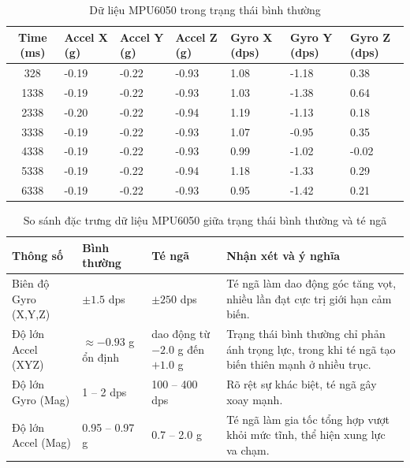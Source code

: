 \begin{table}[H]
\centering
\caption{Dữ liệu MPU6050 trong trạng thái bình thường}
\label{tab:normal_log_data}
\begin{tabularx}{\textwidth}{|c|X|X|X|X|X|X|}
\hline
\textbf{Time (ms)} & \textbf{Accel X (g)} & \textbf{Accel Y (g)} & \textbf{Accel Z (g)} & \textbf{Gyro X (dps)} & \textbf{Gyro Y (dps)} & \textbf{Gyro Z (dps)} \\
\hline
328  & -0.19 & -0.22 & -0.93 & 1.08 & -1.18 & 0.38 \\
1338 & -0.19 & -0.22 & -0.93 & 1.03 & -1.38 & 0.64 \\
2338 & -0.20 & -0.22 & -0.94 & 1.19 & -1.13 & 0.18 \\
3338 & -0.19 & -0.22 & -0.93 & 1.07 & -0.95 & 0.35 \\
4338 & -0.19 & -0.22 & -0.93 & 0.99 & -1.02 & -0.02 \\
5338 & -0.19 & -0.22 & -0.94 & 1.18 & -1.33 & 0.29 \\
6338 & -0.19 & -0.22 & -0.93 & 0.95 & -1.42 & 0.21 \\
\hline
\end{tabularx}
\end{table}

\begin{table}[H]
\centering
\caption{So sánh đặc trưng dữ liệu MPU6050 giữa trạng thái bình thường và té ngã}
\label{tab:mpu6050_new_comparison}
\begin{tabularx}{\textwidth}{|l|p{2.5cm}|p{2.5cm}|X|}
\hline
\textbf{Thông số} & \textbf{Bình thường} & \textbf{Té ngã} & \textbf{Nhận xét và ý nghĩa} \\
\hline
Biên độ Gyro (X,Y,Z) & $\pm 1.5$ dps & $\pm 250$ dps & Té ngã làm dao động góc tăng vọt, nhiều lần đạt cực trị giới hạn cảm biến. \\
\hline
Độ lớn Accel (XYZ) & $\approx -0.93$ g ổn định & dao động từ $-2.0$ g đến $+1.0$ g & Trạng thái bình thường chỉ phản ánh trọng lực, trong khi té ngã tạo biến thiên mạnh ở nhiều trục. \\
\hline
Độ lớn Gyro (Mag) & 1 -- 2 dps & 100 -- 400 dps & Rõ rệt sự khác biệt, té ngã gây xoay mạnh. \\
\hline
Độ lớn Accel (Mag) & 0.95 -- 0.97 g & 0.7 -- 2.0 g & Té ngã làm gia tốc tổng hợp vượt khỏi mức tĩnh, thể hiện xung lực va chạm. \\
\hline
\end{tabularx}
\end{table}

